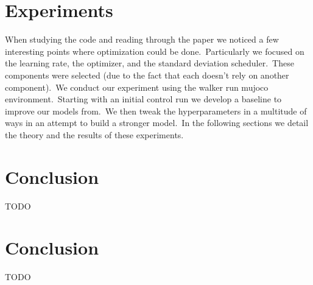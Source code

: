 \documentclass[conference]{./IEEEtran/IEEEtran} %
\begin{document}
    \section{Experiments}\label{sec:experiments}

    When studying the code and reading through the paper we noticed a few interesting points where optimization could be done.\
    Particularly we focused on the learning rate, the optimizer, and the standard deviation scheduler.\ These components were
    selected (due to the fact that each doesn't rely on another component).\ We conduct our experiment using the walker run mujoco
    environment.\ Starting with an initial control run we develop a baseline to improve our models from.\ We then tweak the
    hyperparameters in a multitude of ways in an attempt to build a stronger model.\ In the following sections we detail the theory
    and the results of these experiments.

    \section{Conclusion}\label{sec:results}

    TODO

    \section{Conclusion}\label{sec:conclusion}

    TODO

    
    
\end{document}
